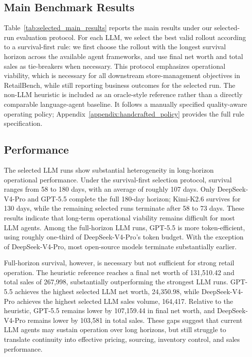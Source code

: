 \subsection{Main Benchmark Results}



Table~\ref{tab:selected_main_results} reports the main results under our selected-run evaluation protocol. For each LLM, we select the best valid rollout according to a survival-first rule: we first choose the rollout with the longest survival horizon across the available agent frameworks, and use final net worth and total sales as tie-breakers when necessary. This protocol emphasizes operational viability, which is necessary for all downstream store-management objectives in RetailBench, while still reporting business outcomes for the selected run. The non-LLM heuristic is included as an oracle-style reference rather than a directly comparable language-agent baseline. It follows a manually specified quality-aware operating policy; Appendix~\ref{appendix:handcrafted_policy} provides the full rule specification.

\subsection{Performance}

The selected LLM runs show substantial heterogeneity in long-horizon operational performance. Under the survival-first selection protocol, survival ranges from 58 to 180 days, with an average of roughly 107 days. Only DeepSeek-V4-Pro and GPT-5.5 complete the full 180-day horizon; Kimi-K2.6 survives for 130 days, while the remaining selected runs terminate after 58 to 73 days. These results indicate that long-term operational viability remains difficult for most LLM agents. Among the full-horizon LLM runs, GPT-5.5 is more token-efficient, using roughly one-third of DeepSeek-V4-Pro's token budget. With the exception of DeepSeek-V4-Pro, most open-source models terminate substantially earlier.

Full-horizon survival, however, is necessary but not sufficient for strong retail operation. The heuristic reference reaches a final net worth of 131{,}510.42 and total sales of 267{,}998, substantially outperforming the strongest LLM runs. GPT-5.5 achieves the highest selected LLM net worth, 24{,}350.98, while DeepSeek-V4-Pro achieves the highest selected LLM sales volume, 164{,}417. Relative to the heuristic, GPT-5.5 remains lower by 107{,}159.44 in final net worth, and DeepSeek-V4-Pro remains lower by 103{,}581 in total sales. These gaps suggest that current LLM agents may sustain operation over long horizons, but still struggle to translate continuity into effective pricing, sourcing, inventory control, and sales performance.
